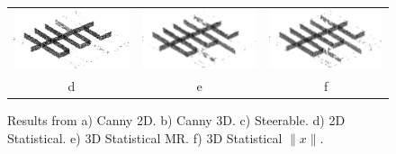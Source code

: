 \documentclass[9pt]{beamer}
\begin{document}
\begin{frame}[shrink]
\begin{figure}
\begin{tabular}{c c c }
\includegraphics[scale=0.2]{stat2dmulti.eps}&\includegraphics[scale=0.2]{T3_11}&\includegraphics[scale=0.2]{T13_9}\\
d & e & f\\

\end{tabular}
\caption{ Results from a) Canny 2D. b) Canny 3D. c) Steerable. d) 2D Statistical. e) 3D Statistical MR. f) 3D Statistical $\|x\|$.}
\end{figure}
\end{frame}
\end{document}
